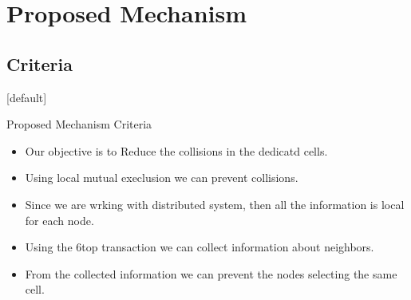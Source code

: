 \documentclass{beamer}
\makeatletter
\newenvironment{withoutheadline}{
        \setbeamertemplate{headline}[default]
        \def\beamer@entrycode{\vspace*{-\headheight}}
    }{}
\makeatother
\begin{document}
\section{Proposed Mechanism}

\subsection{Criteria}
\begin{withoutheadline}
\begin{frame}{Proposed Mechanism Criteria}
\begin{itemize}
    \item Our objective is to Reduce the collisions in the dedicatd cells.\pause
    \item Using local mutual execlusion we can prevent collisions.\pause  
    \item Since we are wrking with distributed system, then all the information is local for each node. \pause
    \item Using the 6top transaction we can collect information about neighbors. \pause
    \item From the collected information we can prevent the nodes selecting the same cell. \pause
    \end{itemize}

\end{frame}
\end{withoutheadline}
\end{document}
